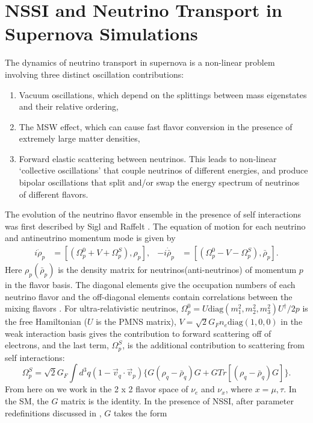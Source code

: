 \documentclass[a4paper,12pt]{article}
\begin{document}
\section{NSSI and Neutrino Transport in Supernova Simulations}
The dynamics of neutrino transport in supernova is a non-linear problem involving three distinct oscillation contributions:
\begin{enumerate}
\item Vacuum oscillations, which depend on the splittings between mass eigenstates and their relative ordering,
\item The MSW effect, which can cause fast flavor conversion in the presence of extremely large matter densities,
\item Forward elastic scattering between neutrinos. This leads to non-linear `collective oscillations' that couple neutrinos of different energies, and produce bipolar oscillations that split and/or swap the energy spectrum of neutrinos of different flavors.
\end{enumerate}
The evolution of the neutrino flavor ensemble in the presence of self interactions was first described by Sigl and Raffelt \cite{Sigl:1992fn}. The equation of motion for each neutrino and antineutrino momentum mode is given by
\begin{align}
i\dot{\rho}_{p} &= [(\Omega^{0}_{p} + V + \Omega^{S}_{p}), \rho_{p}], & -i\dot{\bar{\rho}}_{p} &= [(\Omega^{0}_{p} - V - \Omega^{S}_{p}), \bar{\rho}_{p}].
\end{align}
Here $\rho_{p}(\bar{\rho}_{p})$ is the density matrix for neutrinos(anti-neutrinos) of momentum $p$ in the flavor basis. The diagonal elements give the occupation numbers of each neutrino flavor and the off-diagonal elements contain correlations between the mixing flavors \cite{Sigl:1992fn}. For ultra-relativistic neutrinos, $\Omega^{0}_{p} = U\text{diag}(m^{2}_{1}, m^{2}_{2}, m^{2}_{3})U^{\dagger}/2p$ is the free Hamiltonian ($U$ is the PMNS matrix),  $V = \sqrt{2}G_{F}n_{e}\text{diag}(1,0,0)$ in the weak interaction basis gives the contribution to forward scattering off of electrons, and the last term, $\Omega^{S}_{p}$, is the additional contribution to scattering from self interactions: 
\begin{equation}
\Omega^{S}_{p} = \sqrt{2}G_{F}\int d^{3}q (1 - \vec{v}_{q} \cdot \vec{v}_{p})\{G(\rho_{q} - \bar{\rho}_{q})G + GTr[(\rho_{q} - \bar{\rho}_{q})G]\}.
\end{equation}
From here on we work in the 2 x 2 flavor space of $\nu_{e}$ and $\nu_{x}$, where $x = \mu, \tau$. In the SM, the $G$ matrix is the identity. In the presence of NSSI, after parameter redefinitions discussed in \cite{Dighe:2017sur}, $G$ takes the form
\end{document}
